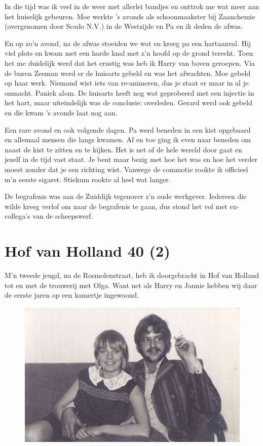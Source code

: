 \documentclass[12pt,twoside, openright]{memoir}
\begin{document}
In die tijd was ik veel in de weer met allerlei bandjes en onttrok me wat meer aan het huiselijk gebeuren. Moe werkte ’s avonds als schoonmaakster bij Zaanchemie (overgenomen door Scado N.V.) in de Westzijde en Pa en ik deden de afwas. 

En op zo’n avond, na de afwas stoeiden we wat en kreeg pa een hartaanval. Hij viel plots en kwam met een harde knal met z’n hoofd op de grond terecht. Toen het me duidelijk werd dat het ernstig was heb ik Harry van boven geroepen. Via de buren Zeeman werd er de huisarts gebeld en was het afwachten. Moe gebeld op haar werk. Niemand wist iets van re-animeren, dus je staat er maar in al je onmacht. Paniek alom. De huisarts heeft nog wat geprobeerd met een injectie in het hart, maar uiteindelijk was de conclusie: overleden. Gerard werd ook gebeld en die kwam ’s avonds laat nog aan. 

Een rare avond en ook volgende dagen. Pa werd beneden in een kist opgebaard en allemaal mensen die langs kwamen. Af en toe ging ik even naar beneden om naast de kist te zitten en te kijken. Het is net of de hele wereld door gaat en jezelf in de tijd vast staat. Je bent maar bezig met hoe het was en hoe het verder moest zonder dat je een richting wist. Vanwege de commotie rookte ik officieel m’n eerste sigaret. Stiekum rookte al heel wat langer.

De begrafenis was aan de Zuiddijk tegenover z’n oude werkgever. Iedereen die wilde kreeg verlof om naar de begrafenis te gaan, dus stond het vol met ex-collega’s van de scheepswerf. 

\chapter{Hof van Holland 40 (2)} %
\label{cha:hofvanholland2}

M’n tweede jeugd, na de Rosmolenstraat, heb ik doorgebracht in Hof van Holland tot en met de trouwerij met Olga. Want net als Harry en Jannie hebben wij daar de eerste jaren op een kamertje ingewoond.

\begin{figure}[h]
\includegraphics[width=\textwidth]{img/ch22/joho_0001}
\end{figure}
\end{document}
